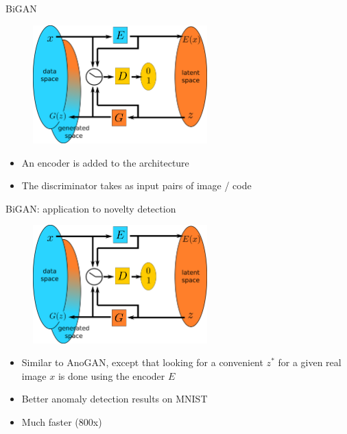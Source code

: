 \documentclass[xcolor=pdftex,dvipsnames,table,mathserif]{beamer}
\begin{document}
\begin{frame}{BiGAN}

\begin{figure}[ht]
  \centering
  \includegraphics[width=0.6\textwidth]{bigan}
\end{figure}

\begin{itemize}
\item An encoder is added to the architecture
\item The discriminator takes as input pairs of image / code
\end{itemize}


\end{frame}

\begin{frame}{BiGAN: application to novelty detection}

\begin{figure}[ht]
  \centering
  \includegraphics[width=0.6\textwidth]{bigan}
\end{figure}

\begin{itemize}
\item Similar to AnoGAN, except that looking for a convenient $z^*$ for a given real image $x$ is done using the encoder $E$
\item Better anomaly detection results on MNIST
\item Much faster (800x)
\end{itemize}


\end{frame}
\end{document}
